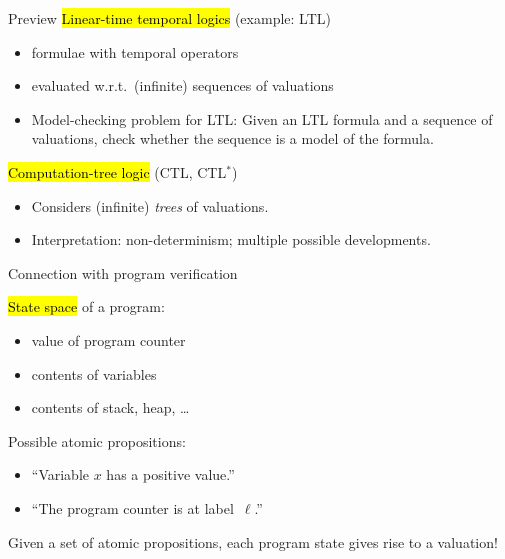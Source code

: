 
\begin{frame}{Preview}
\hl{Linear-time temporal logics} (example: LTL)
\begin{itemize}
\item formulae with temporal operators
\item evaluated w.r.t.\ (infinite) sequences of valuations
\item Model-checking problem for LTL: Given an LTL formula and a
   sequence of valuations, check whether the sequence is a model
   of the formula.
\end{itemize}

\bigskip
\hl{Computation-tree logic} (CTL, CTL${}^*$)
\begin{itemize}
\item Considers (infinite) \emph{trees} of valuations.
\item Interpretation: non-determinism; multiple possible developments.
\end{itemize}

\end{frame}


\begin{frame}{Connection with program verification}

\hl{State space} of a program:
\begin{itemize}
\item value of program counter
\item contents of variables
\item contents of stack, heap, \ldots
\end{itemize}

\bigskip
Possible atomic propositions:
\begin{itemize}
\item ``Variable $x$ has a positive value.''
\item ``The program counter is at label~$\ell$.''
\end{itemize}

\bigskip
Given a set of atomic propositions, each program state gives rise to a valuation!

\end{frame}


